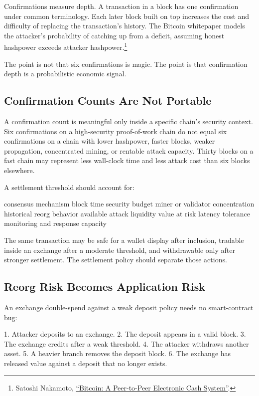 Confirmations measure depth. A transaction in a block has one confirmation under common terminology. Each later block built on top increases the cost and difficulty of replacing the transaction's history. The Bitcoin whitepaper models the attacker's probability of catching up from a deficit, assuming honest hashpower exceeds attacker hashpower.\footnote{Satoshi Nakamoto, \href{https://bitcoin.org/bitcoin.pdf}{``Bitcoin: A Peer-to-Peer Electronic Cash System''}.}

The point is not that six confirmations is magic. The point is that confirmation depth is a probabilistic economic signal.

\subsection{Confirmation Counts Are Not Portable}

A confirmation count is meaningful only inside a specific chain's security context. Six confirmations on a high-security proof-of-work chain do not equal six confirmations on a chain with lower hashpower, faster blocks, weaker propagation, concentrated mining, or rentable attack capacity. Thirty blocks on a fast chain may represent less wall-clock time and less attack cost than six blocks elsewhere.

A settlement threshold should account for:

\begin{codeblock}
consensus mechanism
block time
security budget
miner or validator concentration
historical reorg behavior
available attack liquidity
value at risk
latency tolerance
monitoring and response capacity
\end{codeblock}

The same transaction may be safe for a wallet display after inclusion, tradable inside an exchange after a moderate threshold, and withdrawable only after stronger settlement. The settlement policy should separate those actions.

\subsection{Reorg Risk Becomes Application Risk}

An exchange double-spend against a weak deposit policy needs no smart-contract bug:

\begin{codeblock}
1. Attacker deposits to an exchange.
2. The deposit appears in a valid block.
3. The exchange credits after a weak threshold.
4. The attacker withdraws another asset.
5. A heavier branch removes the deposit block.
6. The exchange has released value against a deposit that no longer exists.
\end{codeblock}

